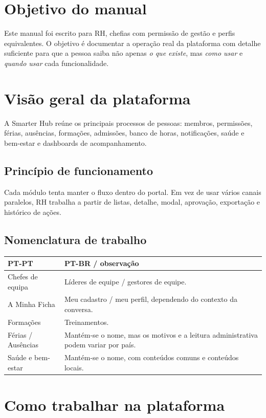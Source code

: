 \chapter{Objetivo do manual}
Este manual foi escrito para RH, chefias com permissão de gestão e perfis equivalentes. O objetivo é documentar a operação real da plataforma com detalhe suficiente para que a pessoa saiba não apenas \textit{o que existe}, mas \textit{como usar} e \textit{quando usar} cada funcionalidade.

\chapter{Visão geral da plataforma}
A Smarter Hub reúne os principais processos de pessoas: membros, permissões, férias, ausências, formações, admissões, banco de horas, notificações, saúde e bem-estar e dashboards de acompanhamento.

\section{Princípio de funcionamento}
Cada módulo tenta manter o fluxo dentro do portal. Em vez de usar vários canais paralelos, RH trabalha a partir de listas, detalhe, modal, aprovação, exportação e histórico de ações.

\section{Nomenclatura de trabalho}
\begin{longtable}{|p{}|p{}|}
\hline
\textbf{PT-PT} & \textbf{PT-BR / observação} \\
\hline
Chefes de equipa & Líderes de equipe / gestores de equipe. \\
\hline
A Minha Ficha & Meu cadastro / meu perfil, dependendo do contexto da conversa. \\
\hline
Formações & Treinamentos. \\
\hline
Férias / Ausências & Mantém-se o nome, mas os motivos e a leitura administrativa podem variar por país. \\
\hline
Saúde e bem-estar & Mantém-se o nome, com conteúdos comuns e conteúdos locais. \\
\hline
\end{longtable}

\chapter{Como trabalhar na plataforma}
